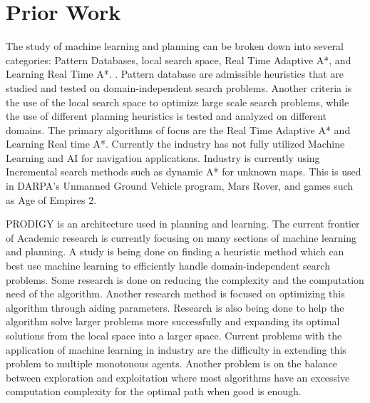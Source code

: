 \documentclass[tog]{acmsiggraph}
\begin{document}
\section{Prior Work}
The study of machine learning and planning can be broken down into
several categories: Pattern Databases, local search space, Real Time
Adaptive A*, and Learning Real Time A*. . Pattern database are
admissible heuristics that are studied and tested on
domain-independent search problems. Another criteria is the use of the
local search space to optimize large scale search problems, while the
use of different planning heuristics is tested and analyzed on
different domains.\cite{haslum2007domain} The primary algorithms of
focus are the Real Time Adaptive A* and Learning Real time A*.
Currently the industry has not fully utilized Machine Learning and AI
for navigation applications. Industry is currently using Incremental
search methods such as dynamic A* for unknown maps. This is used in
DARPA’s Unmanned Ground Vehicle program, Mars Rover, and games such as
Age of Empires 2.

PRODIGY is an architecture used in planning and
learning.\cite{stone1994need} The current frontier of Academic
research is currently focusing on many sections of machine learning
and planning. A study is being done on finding a heuristic method
which can best use machine learning to efficiently handle
domain-independent search problems. Some research is done on reducing
the complexity and the computation need of the algorithm. Another
research method is focused on optimizing this algorithm through aiding
parameters. Research is also being done to help the algorithm solve
larger problems more successfully and expanding its optimal solutions
from the local space into a larger space. Current problems with the
application of machine learning in industry are the difficulty in
extending this problem to multiple monotonous agents. Another problem
is on the balance between exploration and exploitation where most
algorithms have an excessive computation complexity for the optimal
path when good is enough.
\end{document}
